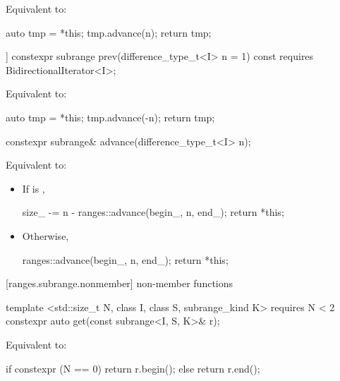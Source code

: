 \begin{addedblock}
\begin{itemdescr}
\pnum
\effects Equivalent to:
\begin{codeblock}
auto tmp = *this;
tmp.advance(n);
return tmp;
\end{codeblock}
\end{itemdescr}

%
\begin{itemdecl}
[[nodiscard]] constexpr subrange prev(difference_type_t<I> n = 1) const
  requires BidirectionalIterator<I>;
\end{itemdecl}

\begin{itemdescr}
\pnum
\effects Equivalent to:
\begin{codeblock}
auto tmp = *this;
tmp.advance(-n);
return tmp;
\end{codeblock}
\end{itemdescr}

%
\begin{itemdecl}
constexpr subrange& advance(difference_type_t<I> n);
\end{itemdecl}

\begin{itemdescr}
\pnum
\effects Equivalent to:
\begin{itemize}
\item If  is ,
\begin{codeblock}
size_ -= n - ranges::advance(begin_, n, end_);
return *this;
\end{codeblock}
\item Otherwise,
\begin{codeblock}
ranges::advance(begin_, n, end_);
return *this;
\end{codeblock}
\end{itemize}
\end{itemdescr}

[ranges.subrange.nonmember]{ non-member functions}

%
\begin{itemdecl}
template <std::size_t N, class I, class S, subrange_kind K>
  requires N < 2
constexpr auto get(const subrange<I, S, K>& r);
\end{itemdecl}

\begin{itemdescr}
\pnum
\effects Equivalent to:
\begin{codeblock}
if constexpr (N == 0)
  return r.begin();
else
  return r.end();
\end{codeblock}
\end{itemdescr}
\end{addedblock}

